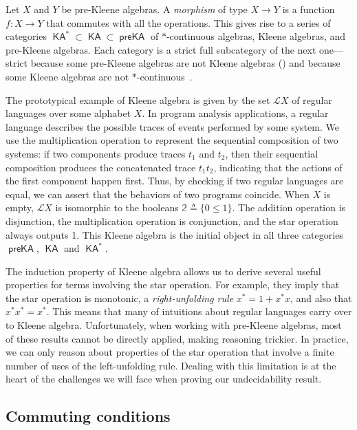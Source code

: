 \documentclass[a4paper,UKenglish,cleveref, autoref, thm-restate]{lipics-v2021}
\DeclareMathOperator{\preKA}{\mathsf{preKA}}
\DeclareMathOperator{\KA}{\mathsf{KA}}
\begin{document}
Let $X$ and $Y$ be pre-Kleene algebras.  A \emph{morphism} of type $X \to Y$ is
a function $f : X \to Y$ that commutes with all the operations.  This gives rise
to a series of categories $\KA^* \subset \KA \subset \preKA$ of $*$-continuous
algebras, Kleene algebras, and pre-Kleene algebras. Each category is a strict
full subcategory of the next one---strict because some pre-Kleene algebras are
not Kleene algebras () and because some Kleene
algebras are not $*$-continuous~\cite{kozen_KleeneAlgebrasClosed_1990}.

The prototypical example of Kleene algebra is given by the set $\mathcal{L}X$ of
regular languages over some alphabet $X$.  In program analysis applications, a
regular language describes the possible traces of events performed by some
system. We use the multiplication operation to represent the sequential
composition of two systems: if two components produce traces $t_1$ and $t_2$,
then their sequential composition produces the concatenated trace $t_1t_2$,
indicating that the actions of the first component happen first.  Thus, by
checking if two regular languages are equal, we can assert that the behaviors of
two programs coincide.  When $X$ is empty, $\mathcal{L}X$ is isomorphic to the
booleans $\mathbb{2}  \triangleq  \{0 \leq 1\}$.  The addition operation is disjunction, the
multiplication operation is conjunction, and the star operation always outputs
1. This Kleene algebra is the initial object in all three categories $\preKA$,
$\KA$ and $\KA^*$.

The induction property of Kleene algebra allows us to derive several useful
properties for terms involving the star operation.  For example, they imply that
the star operation is monotonic, a \emph{right-unfolding rule} $x^* = 1 + x^*x$,
and also that $x^*x^* = x^*$.  This means that many of intuitions about regular
languages carry over to Kleene algebra.  Unfortunately, when working with
pre-Kleene algebras, most of these results cannot be directly applied, making
reasoning trickier.  In practice, we can only reason about properties of the
star operation that involve a finite number of uses of the left-unfolding rule.
Dealing with this limitation is at the heart of the challenges we will face when
proving our undecidability result.

\subsection{Commuting conditions}
\end{document}
